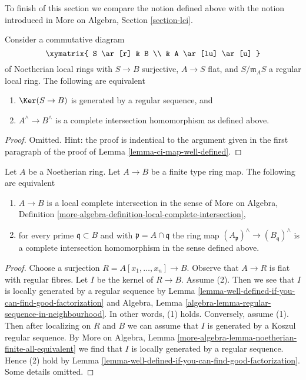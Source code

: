 \noindent
To finish of this section we compare the notion defined above
with the notion introduced in
More on Algebra, Section \ref{section-lci}.

\begin{lemma}
\label{lemma-well-defined-if-you-can-find-good-factorization}
Consider a commutative diagram
$$
\xymatrix{
S \ar[r] & B \\
& A \ar[lu] \ar[u]
}
$$
of Noetherian local rings with $S \to B$ surjective, $A \to S$ flat, and
$S/\mathfrak m_A S$ a regular local ring. The following are equivalent
\begin{enumerate}
\item $\Ker(S \to B)$ is generated by a regular sequence, and
\item $A^\wedge \to B^\wedge$ is a complete intersection homomorphism
as defined above.
\end{enumerate}
\end{lemma}

\begin{proof}
Omitted. Hint: the proof is indentical to the argument given in
the first paragraph of the proof of Lemma \ref{lemma-ci-map-well-defined}.
\end{proof}

\begin{lemma}
\label{lemma-finite-type-lci-map}
Let $A$ be a Noetherian ring.
Let $A \to B$ be a finite type ring map.
The following are equivalent
\begin{enumerate}
\item $A \to B$ is a local complete intersection in the sense of
More on Algebra, Definition
\ref{more-algebra-definition-local-complete-intersection},
\item for every prime $\mathfrak q \subset B$ and with
$\mathfrak p = A \cap \mathfrak q$ the ring map
$(A_\mathfrak p)^\wedge \to (B_\mathfrak q)^\wedge$ is
a complete intersection homomorphism in the sense defined above.
\end{enumerate}
\end{lemma}

\begin{proof}
Choose a surjection $R = A[x_1, \ldots, x_n] \to B$.
Observe that $A \to R$ is flat with regular fibres.
Let $I$ be the kernel of $R \to B$.
Assume (2). Then we see that
$I$ is locally generated by a regular sequence
by
Lemma \ref{lemma-well-defined-if-you-can-find-good-factorization}
and
Algebra, Lemma \ref{algebra-lemma-regular-sequence-in-neighbourhood}.
In other words, (1) holds.
Conversely, assume (1). Then after localizing on $R$ and $B$
we can assume that $I$ is generated by a Koszul regular sequence.
By More on Algebra, Lemma
\ref{more-algebra-lemma-noetherian-finite-all-equivalent}
we find that $I$ is locally generated by a regular sequence.
Hence (2) hold by
Lemma \ref{lemma-well-defined-if-you-can-find-good-factorization}.
Some details omitted.
\end{proof}

